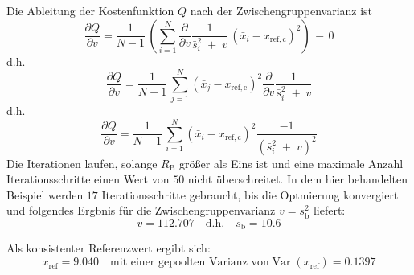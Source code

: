 Die Ableitung der Kostenfunktion $Q$ nach der Zwischengruppenvarianz ist
\begin{equation*}
\frac{\partial Q}{\partial v} = \frac{1}{N-1} \, \left( \sum\limits_{i=1}^N 
\frac{\partial }{\partial v} \frac{1}{\bar s^2_i \; + \; v} \, \left(\bar x_i - x_\mathrm{ref, c}\right)^2  \right) \, - \, 0
\end{equation*}
d.h.
\begin{equation*}
\frac{\partial Q}{\partial v} = \frac{1}{N-1} \, \sum\limits_{j=1}^N  \left(\bar x_j - x_\mathrm{ref, c}\right)^2 
\frac{\partial }{\partial v} \frac{1}{\bar s^2_i \; + \; v} 
\end{equation*}
d.h.
\begin{equation}
\frac{\partial Q}{\partial v} = \frac{1}{N-1} \, \sum\limits_{i=1}^N  \left(\bar x_i - x_\mathrm{ref, c}\right)^2 
\frac{-1}{\left(\bar s^2_i \; + \; v\right)^2} 
\end{equation}
Die Iterationen laufen, solange $R_\mathrm{B}$ größer als Eins ist und eine maximale Anzahl Iterationsschritte
einen Wert von $50$ nicht überschreitet.
In dem hier behandelten Beispiel werden $17$ Iterationsschritte gebraucht, bis die
Optmierung konvergiert und folgendes Ergbnis für die Zwischengruppenvarianz $v = s^2_\mathrm{b}$
liefert:
$$
v = 112.707 \quad \text{d.h.} \quad s_\mathrm{b} = 10.6
$$

Als konsistenter Referenzwert ergibt sich:
\begin{equation}
x_\mathrm{ref} = 9.040 \quad \text{mit einer gepoolten Varianz von} 
\operatorname{Var}(x_\mathrm{ref}) = 0.1397
\end{equation}

